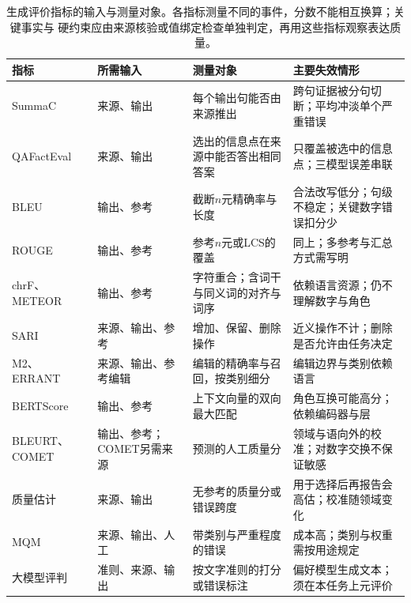 \begin{table}[htbp]
  \centering
  \small
  \renewcommand{\tabularxcolumn}[1]{>{\raggedright\arraybackslash}p{#1}}
  \begin{tabularx}{\linewidth}{@{}>{\raggedright\arraybackslash}p{24mm}>{\raggedright\arraybackslash}p{30mm}XX@{}}
    \toprule
    指标 & 所需输入 & 测量对象 & 主要失效情形\\
    \midrule
    SummaC & 来源、输出 & 每个输出句能否由来源推出 & 跨句证据被分句切断；平均冲淡单个严重错误\\
    QAFactEval & 来源、输出 & 选出的信息点在来源中能否答出相同答案 & 只覆盖被选中的信息点；三模型误差串联\\
    BLEU & 输出、参考 & 截断$n$元精确率与长度 & 合法改写低分；句级不稳定；关键数字错误扣分少\\
    ROUGE & 输出、参考 & 参考$n$元或LCS的覆盖 & 同上；多参考与汇总方式需写明\\
    chrF、METEOR & 输出、参考 & 字符重合；含词干与同义词的对齐与词序 & 依赖语言资源；仍不理解数字与角色\\
    SARI & 来源、输出、参考 & 增加、保留、删除操作 & 近义操作不计；删除是否允许由任务决定\\
    M2、ERRANT & 来源、输出、参考编辑 & 编辑的精确率与召回，按类别细分 & 编辑边界与类别依赖语言\\
    BERTScore & 输出、参考 & 上下文向量的双向最大匹配 & 角色互换可能高分；依赖编码器与层\\
    BLEURT、COMET & 输出、参考；COMET另需来源 & 预测的人工质量分 & 领域与语向外的校准；对数字交换不保证敏感\\
    质量估计 & 来源、输出 & 无参考的质量分或错误跨度 & 用于选择后再报告会高估；校准随领域变化\\
    MQM & 来源、输出、人工 & 带类别与严重程度的错误 & 成本高；类别与权重需按用途规定\\
    大模型评判 & 准则、来源、输出 & 按文字准则的打分或错误标注 & 偏好模型生成文本；须在本任务上元评价\\
    \bottomrule
  \end{tabularx}
  \caption{生成评价指标的输入与测量对象。各指标测量不同的事件，分数不能相互换算；关键事实与
  硬约束应由来源核验或值绑定检查单独判定，再用这些指标观察表达质量。}
  \label{tab:nlp-generation-metrics}
\end{table}

